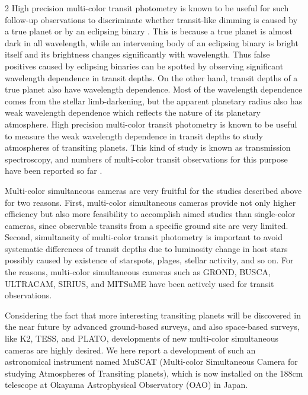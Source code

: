 \documentclass[a4paper,12pt]{spieman}  %
\begin{document}
\begin{spacing}{2}
High precision multi-color transit photometry is known to be useful for such follow-up observations
to discriminate whether transit-like dimming is caused by a true planet or by an eclipsing binary
\cite{2012MNRAS.426..342C}.
This is because a true planet is almost dark in all wavelength, while an intervening body
of an eclipsing binary is bright itself and its brightness changes significantly with wavelength.
Thus false positives caused by eclipsing binaries can be spotted by observing significant
wavelength dependence in transit depths.
On the other hand, transit depths of a true planet also have wavelength dependence.
Most of the wavelength dependence comes from the stellar limb-darkening,
but the apparent planetary radius also has weak wavelength dependence
which reflects the nature of its planetary atmosphere.
High precision multi-color transit photometry is known to be useful
to measure the weak wavelength dependence in transit depths to study atmospheres of transiting planets.
This kind of study is known as transmission spectroscopy, and numbers of
multi-color transit observations for this purpose have been reported so far
\cite{2013A&A...553A..26N,2013MNRAS.436....2M,2014MNRAS.443.2391M,2014MNRAS.437.1511B,
2013PASJ...65...27N,2013ApJ...773..144N,2013ApJ...770...95F,2014ApJ...790..108F}.

Multi-color simultaneous cameras are very fruitful for the studies described above for two reasons.
First, multi-color simultaneous cameras provide not only higher efficiency but also
more feasibility to accomplish aimed studies than single-color cameras,
since observable transits from a specific ground site are very limited.
Second, simultaneity of multi-color transit photometry is important to avoid systematic
differences of transit depths due to luminosity change in host stars possibly
caused by existence of starspots, plages, stellar activity, and so on. 
For the reasons, multi-color simultaneous cameras such as
GROND\cite{2013A&A...553A..26N,2013MNRAS.436....2M},
BUSCA\cite{2014MNRAS.443.2391M},
ULTRACAM\cite{2014MNRAS.437.1511B},
SIRIUS\cite{2013PASJ...65...27N,2013ApJ...773..144N},
and MITSuME\cite{2013ApJ...770...95F,2014ApJ...790..108F} have been actively used for transit observations.

Considering the fact that more interesting transiting planets will be discovered in the near future by
advanced ground-based surveys, and also space-based surveys, like
K2, TESS, and PLATO, developments of new multi-color simultaneous cameras are highly desired.
We here report a development of such an astronomical instrument named MuSCAT
(Multi-color Simultaneous Camera for studying Atmospheres of Transiting planets),
which is now installed on the 188cm telescope at Okayama Astrophysical Observatory (OAO) in Japan.


\end{spacing}
\end{document}
